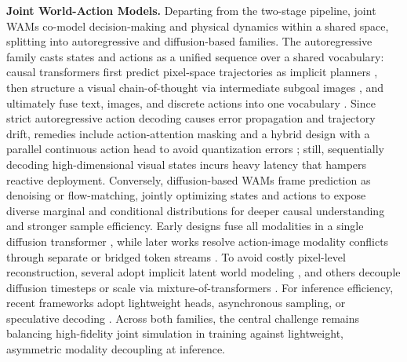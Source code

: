 \documentclass{llmxive}
\begin{document}
\textbf{Joint World-Action Models.}
Departing from the two-stage pipeline, joint WAMs co-model decision-making and physical dynamics within a shared space, splitting into autoregressive and diffusion-based families. The autoregressive family casts states and actions as a unified sequence over a shared vocabulary: causal transformers first predict pixel-space trajectories as implicit planners \cite{wu2024unleashing, cheang2024gr}, then structure a visual chain-of-thought via intermediate subgoal images \cite{zhao2025cot}, and ultimately fuse text, images, and discrete actions into one vocabulary \cite{cen2025worldvla}. Since strict autoregressive action decoding causes error propagation and trajectory drift, remedies include action-attention masking \cite{cen2025worldvla} and a hybrid design with a parallel continuous action head to avoid quantization errors \cite{cen2025rynnvla}; still, sequentially decoding high-dimensional visual states incurs heavy latency that hampers reactive deployment. Conversely, diffusion-based WAMs frame prediction as denoising or flow-matching, jointly optimizing states and actions to expose diverse marginal and conditional distributions for deeper causal understanding and stronger sample efficiency. Early designs fuse all modalities in a single diffusion transformer \cite{guo2024prediction,shen2026videovla,kim2026cosmos}, while later works resolve action-image modality conflicts through separate or bridged token streams \cite{won2025dual,yang2025covar,chen2025unified}. To avoid costly pixel-level reconstruction, several adopt implicit latent world modeling \cite{zheng2025flare,zhao2026frappe,li2026world,yuan2026adaworldpolicy}, and others decouple diffusion timesteps or scale via mixture-of-transformers \cite{zhu2025unified,bi2025motus,team2026motubrain,lyu2026lda}. For inference efficiency, recent frameworks adopt lightweight heads, asynchronous sampling, or speculative decoding \cite{li2025unified,ye2026gigaworld,yuan2026fast,guo2026unified,deng2026dexworldmodel}. Across both families, the central challenge remains balancing high-fidelity joint simulation in training against lightweight, asymmetric modality decoupling at inference.
\end{document}
